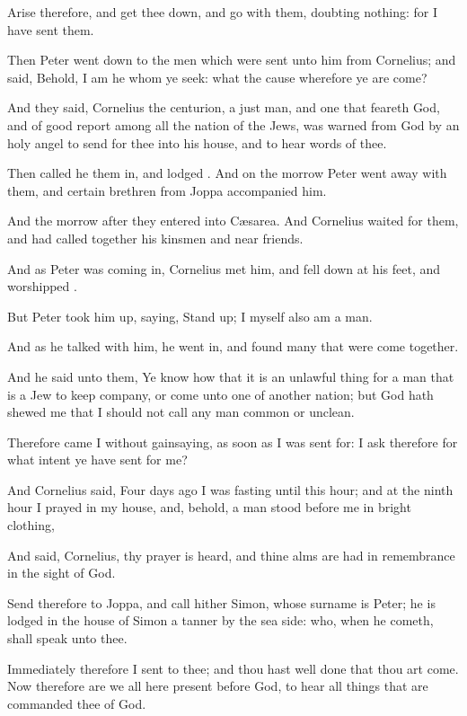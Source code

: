 {Arise
therefore, and get thee
down,
and
go
with
them,
doubting
nothing:
for
I have
sent
them.

Then
Peter went
down
to the
men
which were
sent
unto
him
from
Cornelius; and
said,
Behold,
I
am he
whom ye
seek:
what
{} the
cause
wherefore
ye are
come?

And they
said,
Cornelius the
centurion, a
just
man,
and one that
feareth
God,
and of good
report
among
all the
nation of the
Jews, was warned from
God
by an
holy
angel to send
for
thee
into
his
house,
and to
hear
words
of
thee.

Then called
he
them
in, and
lodged
{}.
And on the
morrow
Peter went
away
with
them,
and
certain
brethren
from
Joppa
accompanied
him.

And the morrow
after they
entered
into
Cæsarea.
And
Cornelius waited
for
them, and
had called
together
his
kinsmen
and
near
friends.

And
as
Peter
was coming
in,
Cornelius
met
him, and fell
down
at his
feet, and
worshipped
{}.

But
Peter
took
him
up,
saying, Stand
up;
I
myself
also
am a
man.

And as he talked
with
him, he went
in,
and
found
many that were come
together.

And he
said
unto
them,
Ye
know how
that it is an unlawful
thing for a
man that
is a
Jew to keep
company,
or come
unto one of another
nation;
but
God hath
shewed
me
that I
should
not
call any
man
common
or
unclean.

Therefore came
I
{} without
gainsaying, as soon as I was sent
for: I
ask
therefore for
what
intent ye have sent
for
me?

And
Cornelius
said,
Four
days
ago I
was
fasting
until
this
hour;
and at the
ninth
hour I
prayed
in
my
house,
and,
behold, a
man
stood
before
me
in
bright
clothing,

And
said,
Cornelius,
thy
prayer is
heard,
and
thine
alms are had in
remembrance in the sight
of
God.

Send
therefore
to
Joppa,
and call
hither
Simon,
whose surname
is
Peter;
he is
lodged
in the
house
of
{}
Simon a
tanner
by the sea
side:
who, when he
cometh, shall
speak unto
thee.

Immediately
therefore I
sent
to
thee;
and
thou
hast
well
done that thou art
come.
Now
therefore are
we
all here
present
before
God, to
hear all
things
that are
commanded
thee
of
God.


}
